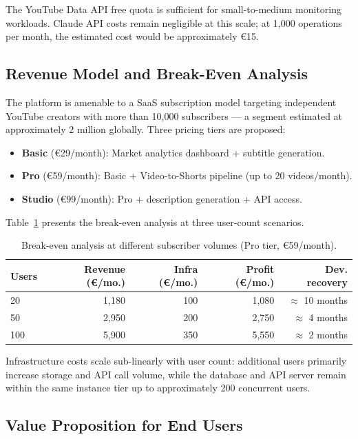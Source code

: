 \documentclass[ENG]{TFUOC}
\begin{document}
The YouTube Data API free quota is sufficient for small-to-medium monitoring workloads. Claude API costs remain negligible at this scale; at 1,000 operations per month, the estimated cost would be approximately €15.

\subsection{Revenue Model and Break-Even Analysis}

The platform is amenable to a SaaS subscription model targeting independent YouTube creators with more than 10,000 subscribers — a segment estimated at approximately 2 million globally. Three pricing tiers are proposed:

\begin{itemize}
\item \textbf{Basic} (€29/month): Market analytics dashboard + subtitle generation.
\item \textbf{Pro} (€59/month): Basic + Video-to-Shorts pipeline (up to 20 videos/month).
\item \textbf{Studio} (€99/month): Pro + description generation + API access.
\end{itemize}

Table~\ref{tab:breakeven} presents the break-even analysis at three user-count scenarios.

\begin{table}[H]
\centering
\caption{Break-even analysis at different subscriber volumes (Pro tier, €59/month).}
\label{tab:breakeven}
\begin{tabular}{@{}lrrrr@{}}
\toprule
\textbf{Users} & \textbf{Revenue (€/mo.)} & \textbf{Infra (€/mo.)} & \textbf{Profit (€/mo.)} & \textbf{Dev. recovery} \\
\midrule
20  & 1,180 & 100  & 1,080 & $\approx$ 10 months \\
50  & 2,950 & 200  & 2,750 & $\approx$ 4 months \\
100 & 5,900 & 350  & 5,550 & $\approx$ 2 months \\
\bottomrule
\end{tabular}
\end{table}

Infrastructure costs scale sub-linearly with user count: additional users primarily increase storage and API call volume, while the database and API server remain within the same instance tier up to approximately 200 concurrent users.

\subsection{Value Proposition for End Users}
\end{document}
